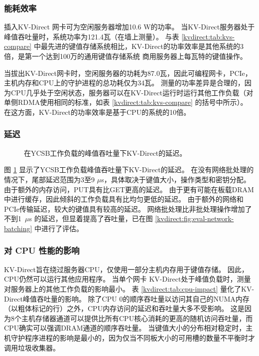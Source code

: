 \subsubsection{能耗效率}

插入KV-Direct 网卡可为空闲服务器增加10.6 W的功率。
当KV-Direct服务器处于峰值吞吐量时，系统功率为121.4瓦（在墙上测量）。
与表 \ref {kvdirect:tab:kvs-compare} 中最先进的键值存储系统相比，KV-Direct的功率效率是其他系统的3倍，是第一个达到100万的通用键值存储系统 商用服务器上每瓦特的键值操作。

当拔出KV-Direct网卡时，空闲服务器的功耗为87.0瓦，因此可编程网卡，PCIe，主机内存和CPU上的守护进程的总功耗仅为34瓦。
测量的功率差异是合理的，因为CPU几乎处于空闲状态，服务器可以在KV-Direct运行时运行其他工作负载（对单侧RDMA使用相同的标准，如表 \ref{kvdirect:tab:kvs-compare} 的括号中所示）。
在这方面，KV-Direct的功率效率是基于CPU的系统的10倍。

\subsubsection{延迟}
\begin{figure}[t]
\centering
{}
\caption{在YCSB工作负载的峰值吞吐量下KV-Direct的延迟。}
\label{kvdirect:fig:ycsb-lat}

\end{figure}

图 \ref {kvdirect:fig:ycsb-lat} 显示了YCSB工作负载峰值吞吐量下KV-Direct的延迟。
在没有网络批处理的情况下，尾部延迟范围为3至9 $\mu$s，具体取决于键值大小，操作类型和密钥分配。
由于额外的内存访问，PUT具有比GET更高的延迟。
由于更有可能在板载DRAM中进行缓存，因此倾斜的工作负载具有比均匀更低的延迟。
由于额外的网络和PCIe传输延迟，较大的键值具有较高的延迟。
网络批处理比非批处理操作增加了不到1~$\mu$s 的延迟，但显着提高了吞吐量，已在图 \ref {kvdirect:fig:eval-network-batching} 中进行了评估。

\subsubsection{对 CPU 性能的影响}


KV-Direct旨在绕过服务器CPU，仅使用一部分主机内存用于键值存储。 因此，CPU仍然可以运行其他应用程序。
当单个网卡 KV-Direct处于峰值负载时，测量对服务器上的其他工作负载的影响最小。
表 \ref {kvdirect:tab:cpu-impact} 量化了KV-Direct峰值吞吐量的影响。
除了CPU 0的顺序吞吐量以访问其自己的NUMA内存（以粗体标记的行）之外，CPU内存访问的延迟和吞吐量大多不受影响。
这是因为8个主机存储器通道可以提供比所有CPU核心消耗的更高的随机访问吞吐量，而CPU确实可以强调DRAM通道的顺序吞吐量。
当键值大小的分布相对稳定时，主机守护程序进程的影响是最小的，因为仅当不同板大小的可用槽的数量不平衡时才调用垃圾收集器。

